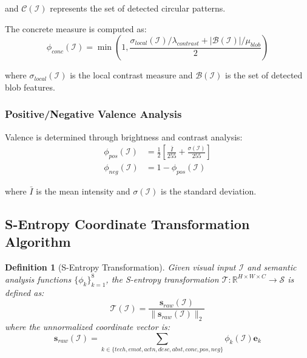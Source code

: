 \documentclass[11pt,a4paper]{article}
\newtheorem{definition}[theorem]{Definition}
\begin{document}
and $\mathcal{C}(\mathcal{I})$ represents the set of detected circular patterns.

The concrete measure is computed as:
\begin{equation}
\phi_{conc}(\mathcal{I}) = \min\left(1, \frac{\sigma_{local}(\mathcal{I})/\lambda_{contrast} + |\mathcal{B}(\mathcal{I})|/\mu_{blob}}{2}\right)
\label{eq:concrete-measure}
\end{equation}

where $\sigma_{local}(\mathcal{I})$ is the local contrast measure and $\mathcal{B}(\mathcal{I})$ is the set of detected blob features.

\subsubsection{Positive/Negative Valence Analysis}

Valence is determined through brightness and contrast analysis:
\begin{align}
\phi_{pos}(\mathcal{I}) &= \frac{1}{2}\left[\frac{\bar{I}}{255} + \frac{\sigma(\mathcal{I})}{255}\right] \label{eq:positive-measure} \\
\phi_{neg}(\mathcal{I}) &= 1 - \phi_{pos}(\mathcal{I}) \label{eq:negative-measure}
\end{align}

where $\bar{I}$ is the mean intensity and $\sigma(\mathcal{I})$ is the standard deviation.

\subsection{S-Entropy Coordinate Transformation Algorithm}

\begin{definition}[S-Entropy Transformation]
Given visual input $\mathcal{I}$ and semantic analysis functions $\{\phi_k\}_{k=1}^8$, the S-entropy transformation $\mathcal{T}: \mathbb{R}^{H \times W \times C} \to \mathcal{S}$ is defined as:
\begin{equation}
\mathcal{T}(\mathcal{I}) = \frac{\mathbf{s}_{raw}(\mathcal{I})}{\|\mathbf{s}_{raw}(\mathcal{I})\|_2}
\label{eq:s-entropy-transform}
\end{equation}
where the unnormalized coordinate vector is:
\begin{equation}
\mathbf{s}_{raw}(\mathcal{I}) = \sum_{k \in \{tech,emot,actn,desc,abst,conc,pos,neg\}} \phi_k(\mathcal{I}) \mathbf{e}_k
\label{eq:raw-coordinate}
\end{equation}
\end{definition}
\end{document}

